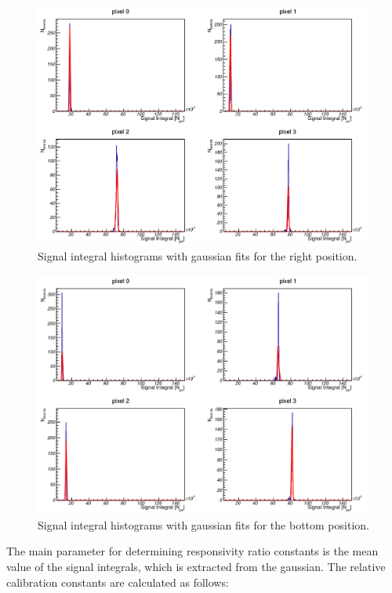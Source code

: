 \begin{figure}[H]
 \centering
 \includegraphics[scale=0.3, angle = 0]{./pictures/right.png}
 \caption{Signal integral histograms with gaussian fits for the right position.}
 \label{rightCal}
 
\end{figure}
\begin{figure}[H]
 \centering
 \includegraphics[scale=0.3, angle = 0]{./pictures/bottom.png}
 \caption{Signal integral histograms with gaussian fits for the bottom position.}
 \label{bottomCal}
 
\end{figure}


The main parameter for determining responsivity ratio constants is the mean value of the signal integrals, which is extracted from the gaussian. The relative calibration constants are calculated as follows:

